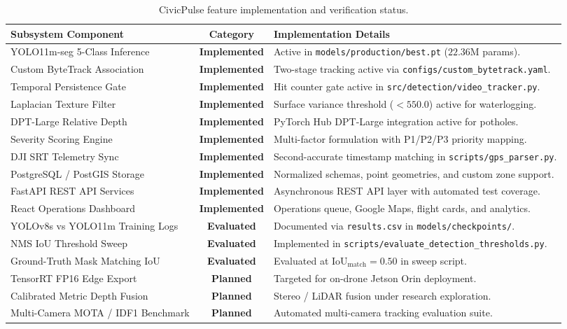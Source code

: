 \documentclass[11pt,a4paper]{article}
\begin{document}
\begin{table}[htbp]
\centering
\small
\caption{CivicPulse feature implementation and verification status.}
\label{tab:status_matrix}
\begin{tabularx}{\textwidth}{l c X}
\toprule
\textbf{Subsystem Component} & \textbf{Category} & \textbf{Implementation Details} \\
\midrule
YOLO11m-seg 5-Class Inference & \textbf{Implemented} & Active in \texttt{models/production/best.pt} ($22.36\text{M}$ params). \\
Custom ByteTrack Association & \textbf{Implemented} & Two-stage tracking active via \texttt{configs/custom\_bytetrack.yaml}. \\
Temporal Persistence Gate & \textbf{Implemented} & Hit counter gate active in \texttt{src/detection/video\_tracker.py}. \\
Laplacian Texture Filter & \textbf{Implemented} & Surface variance threshold ($<550.0$) active for waterlogging. \\
DPT-Large Relative Depth & \textbf{Implemented} & PyTorch Hub DPT-Large integration active for potholes. \\
Severity Scoring Engine & \textbf{Implemented} & Multi-factor formulation with P1/P2/P3 priority mapping. \\
DJI SRT Telemetry Sync & \textbf{Implemented} & Second-accurate timestamp matching in \texttt{scripts/gps\_parser.py}. \\
PostgreSQL / PostGIS Storage & \textbf{Implemented} & Normalized schemas, point geometries, and custom zone support. \\
FastAPI REST API Services & \textbf{Implemented} & Asynchronous REST API layer with automated test coverage. \\
React Operations Dashboard & \textbf{Implemented} & Operations queue, Google Maps, flight cards, and analytics. \\
\midrule
YOLOv8s vs YOLO11m Training Logs & \textbf{Evaluated} & Documented via \texttt{results.csv} in \texttt{models/checkpoints/}. \\
NMS IoU Threshold Sweep & \textbf{Evaluated} & Implemented in \texttt{scripts/evaluate\_detection\_thresholds.py}. \\
Ground-Truth Mask Matching IoU & \textbf{Evaluated} & Evaluated at $\text{IoU}_{\text{match}} = 0.50$ in sweep script. \\
\midrule
TensorRT FP16 Edge Export & \textbf{Planned} & Targeted for on-drone Jetson Orin deployment. \\
Calibrated Metric Depth Fusion & \textbf{Planned} & Stereo / LiDAR fusion under research exploration. \\
Multi-Camera MOTA / IDF1 Benchmark & \textbf{Planned} & Automated multi-camera tracking evaluation suite. \\
\bottomrule
\end{tabularx}
\end{table}
\end{document}
